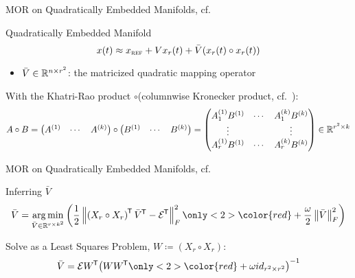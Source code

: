\begin{frame}{MOR on Quadratically Embedded Manifolds, cf.~\cite{Geelen2023}}
    \begin{block}{Quadratically Embedded Manifold}
        \begin{equation*}
            x(t) \approx x_{\textsc{ref}} + V x_r(t) + \bar{V} (x_r(t) \circ x_r(t))
        \end{equation*}
    \end{block}

    \begin{itemize}
        \item $\bar{V} \in \mathbb{R}^{n \times r^2}$: the matricized quadratic mapping operator
    \end{itemize}

    With the Khatri-Rao product $\circ$(columnwise Kronecker product, cf.~\cite{Favier2021}):
    \begin{equation*}
        A \circ B = \begin{pmatrix}
            A^{(1)} & \cdots & A^{(k)}
        \end{pmatrix} \circ \begin{pmatrix}
            B^{(1)} & \cdots & B^{(k)}
        \end{pmatrix} = \begin{pmatrix}
            A_1^{(1)} B^{(1)} & \cdots & A_1^{(k)} B^{(k)} \\
            \vdots & & \vdots \\
            A_r^{(1)} B^{(1)} & \cdots & A_r^{(k)} B^{(k)}
        \end{pmatrix} \in \mathbb{R}^{r^2 \times k}
    \end{equation*}
\end{frame}

\begin{frame}{MOR on Quadratically Embedded Manifolds, cf.~\cite{Geelen2023}}
    \begin{block}{Inferring $\bar{V}$ }
        \vspace{8pt}
        \begin{equation*}
            \bar{V} = \argmin\limits_{\bar{V} \in \bb{R}^{r \times k^2}} \left( \frac{1}{2} \norm[F]{\left( X_r \circ X_r \right)\trans \bar{V}\trans - \mcl{E}\trans}^2 \only<2>{
                {\color{red} + \frac{\omega}{2} \norm[F]{\bar{V}}^2}
            } \right)
        \end{equation*}
    \end{block}

    Solve as a Least Squares Problem, $W \coloneqq \left( X_r \circ X_r \right)$:
    \begin{equation*}
        \bar{V} = \mcl{E} W\trans {\left( W W\trans \only<2>{
            {\color{red} + \omega id_{r^2 \times r^2}}
        } \right)}\inv
    \end{equation*}
\end{frame}